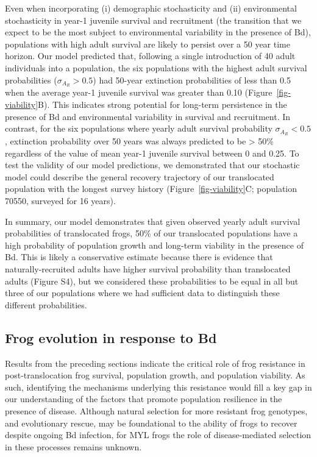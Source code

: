 \documentclass[9pt,twocolumn,twoside,lineno]{pnas-new}
\begin{document}
Even when incorporating (i) demographic stochasticity and (ii)
environmental stochasticity in year-1 juvenile survival and recruitment
(the transition that we expect to be the most subject to environmental
variability in the presence of Bd), populations with high adult survival
are likely to persist over a 50 year time horizon. Our model predicted
that, following a single introduction of 40 adult individuals into a
population, the six populations with the highest adult survival
probabilities (\(\sigma_{A_R} > 0.5\)) had 50-year extinction
probabilities of less than 0.5 when the average year-1 juvenile survival
was greater than 0.10 (Figure~\ref{fig-viability}B). This indicates
strong potential for long-term persistence in the presence of Bd and
environmental variability in survival and recruitment. In contrast, for
the six populations where yearly adult survival probability
\(\sigma_{A_R} < 0.5\), extinction probability over 50 years was always
predicted to be \textgreater{} 50\% regardless of the value of mean
year-1 juvenile survival between 0 and 0.25. To test the validity of our
model predictions, we demonstrated that our stochastic model could
describe the general recovery trajectory of our translocated population
with the longest survey history (Figure~\ref{fig-viability}C;
population 70550, surveyed for 16 years).

In summary, our model demonstrates that given observed yearly adult
survival probabilities of translocated frogs, 50\% of our translocated
populations have a high probability of population growth and long-term
viability in the presence of Bd. This is likely a conservative estimate
because there is evidence that naturally-recruited adults have higher
survival probability than translocated adults
(Figure S4), but we considered these
probabilities to be equal in all but three of our populations where we
had sufficient data to distinguish these different probabilities.

\subsection*{Frog evolution in response to Bd}

Results from the preceding sections indicate the critical role of frog
resistance in post-translocation frog survival, population growth, and
population viability. As such, identifying the mechanisms underlying
this resistance would fill a key gap in our understanding of the factors
that promote population resilience in the presence of disease. Although
natural selection for more resistant frog genotypes, and evolutionary
rescue, may be foundational to the ability of frogs to recover despite
ongoing Bd infection, for MYL frogs the role of disease-mediated
selection in these processes remains unknown.
\end{document}
